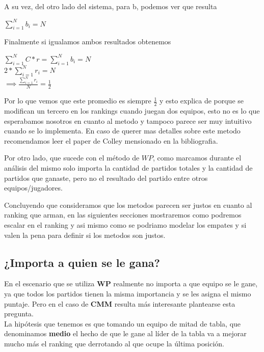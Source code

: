 A su vez, del otro lado del sistema, para b, podemos ver que resulta

\begin{center}
    $\displaystyle\sum_{i=1}^{N}b_i = N$
\end{center}

Finalmente si igualamos ambos resultados obtenemos

\begin{center}
    $\displaystyle\sum_{i=1}^{N}C*r = \displaystyle\sum_{i=1}^{N}b_i = N$\\
    $2*\displaystyle\sum_{i=1}^{N} r_i = N$\\
    $\implies \frac{\displaystyle\sum_{i=1}^{N} r_i}{N} = \frac{1}{2}$\\
\end{center}

Por lo que vemos que este promedio es siempre $\frac{1}{2}$ y esto explica de porque se modifican un tercero en los rankings cuando juegan dos equipos, esto no es lo que esperabamos nosotros en cuanto al metodo y tampoco parece ser muy intuitivo cuando se lo implementa. En caso de querer mas detalles sobre este metodo recomendamos leer el paper de Colley mensionado en la bibliografia.

Por otro lado, que sucede con el método de $WP$, como marcamos durante el análisis del mismo solo importa la cantidad de partidos totales y la cantidad de partidos que ganaste, pero no el resultado del partido entre otros equipos/jugadores.

Concluyendo que consideramos que los metodos parecen ser justos en cuanto al ranking que arman, en las siguientes secciones mostraremos como podremos escalar en el ranking y asi mismo como se podriamo modelar los empates y si valen la pena para definir si los metodos son justos.

\subsection{¿Importa a quien se le gana?}

En el escenario que se utiliza \textbf{WP} realmente no importa a que equipo se le gane, ya que todos los partidos tienen la misma importancia y se les asigna el mismo puntaje. Pero en el caso de \textbf{CMM} resulta más interesante plantearse esta pregunta. \\

La hipótesis que tenemos es que tomando un equipo de mitad de tabla, que denominamos \textbf{medio} el hecho de que le gane al líder de la tabla va a mejorar mucho más el ranking que derrotando al que ocupe la última posición. \\

